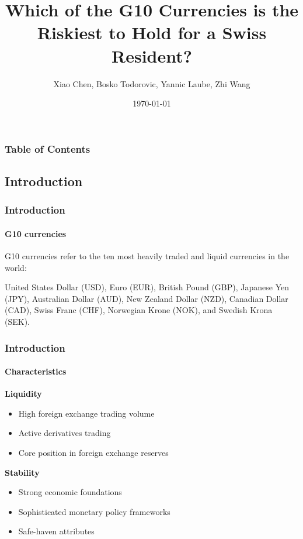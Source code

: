 \documentclass[10pt]{beamer}
\author{Xiao Chen, Bosko Todorovic, Yannic Laube, Zhi Wang}
\title{Which of the G10 Currencies is the Riskiest to Hold for a Swiss Resident?}
\institute{University of Zurich}
\date{\today}
\begin{document}
\begin{frame}
\titlepage
\end{frame}
\begin{frame}
\frametitle{Table of Contents}
\tableofcontents
\end{frame}
\begin{frame}
\section{Introduction}
\frametitle{Introduction}
\framesubtitle{G10 currencies}
G10 currencies refer to the ten most heavily traded and liquid currencies in the world: 

United States Dollar (USD), Euro (EUR), British Pound (GBP), Japanese Yen (JPY), Australian Dollar (AUD), New Zealand Dollar (NZD), Canadian Dollar (CAD), Swiss Franc (CHF), Norwegian Krone (NOK), and Swedish Krona (SEK).

\end{frame}
\begin{frame}
\frametitle{Introduction}
\framesubtitle{Characteristics}
\textbf{Liquidity}
\begin{itemize}
    \item High foreign exchange trading volume
    \item Active derivatives trading
    \item Core position in foreign exchange reserves
\end{itemize}
\textbf{Stability}
\begin{itemize}
    \item Strong economic foundations
    \item Sophisticated monetary policy frameworks
    \item Safe-haven attributes
\end{itemize}
\end{frame}
\end{document}

